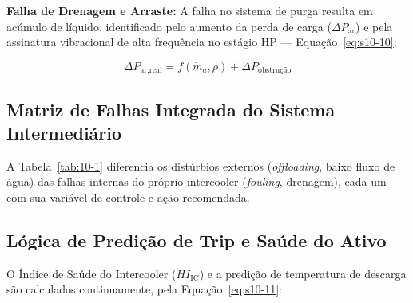 \documentclass[12pt,a4paper]{article}
\numberwithin{equation}{section}
\numberwithin{table}{section}
\numberwithin{figure}{section}
\begin{document}
{	\textbf{Falha de Drenagem e Arraste:} A falha no sistema de purga resulta em acúmulo de líquido, identificado pelo aumento da perda de carga ($\Delta P_{\text{ar}}$) e pela assinatura vibracional de alta frequência no estágio HP — Equação~\eqref{eq:s10-10}:

	\begin{equation}\label{eq:s10-10}
	\Delta P_{\text{ar,real}} = f(\dot{m}_a, \rho) + \Delta P_{\text{obstrução}}
\end{equation}
	
	\subsection{\textbf{Matriz de Falhas Integrada do Sistema Intermediário}}

	A Tabela~\ref{tab:10-1} diferencia os distúrbios externos (\textit{offloading}, baixo fluxo de água) das falhas internas do próprio intercooler (\textit{fouling}, drenagem), cada um com sua variável de controle e ação recomendada.
	\begin{table}[h!tbp]
		\centering
		\renewcommand{\arraystretch}{1.5}
		\caption[Matriz de falhas do intercooler]{Matriz de falhas do intercooler: distúrbios externos versus falhas internas do trocador.}
		\label{tab:10-1}
	\end{table}
	
	\subsection{\textbf{Lógica de Predição de Trip e Saúde do Ativo}}
	O Índice de Saúde do Intercooler ($HI_{\text{IC}}$) e a predição de temperatura de descarga são calculados continuamente, pela Equação~\eqref{eq:s10-11}:

}
\end{document}
